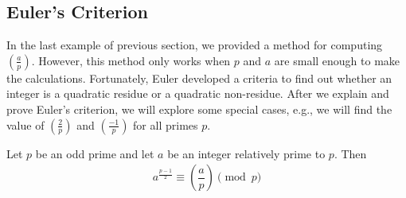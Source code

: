 \documentclass[main.tex]{subfile}
\begin{document}
	\subsection{Euler's Criterion}
	In the last example of previous section, we provided a method for computing $ \left(\frac{a}{p}\right)$. However, this method only works when $p$ and $a$ are small enough to make the calculations. Fortunately, Euler developed a criteria  to find out whether an integer is a quadratic residue or a quadratic non-residue. After we explain and prove Euler's criterion, we will explore some special cases, e.g., we will find the value of $ \left(\frac{2}{p}\right)$ and $ \left(\frac{-1}{p}\right)$ for all primes $p$.

	\begin{theorem}
		\label{thm:eulerscriterion}
		Let $p$ be an odd prime and let $a$ be an integer relatively prime to $p$. Then
		\begin{align*}
			a^{\frac{p-1}{2}} \equiv \left(\dfrac{a}{p}\right) \pmod p
		\end{align*}
	\end{theorem}
\end{document}
